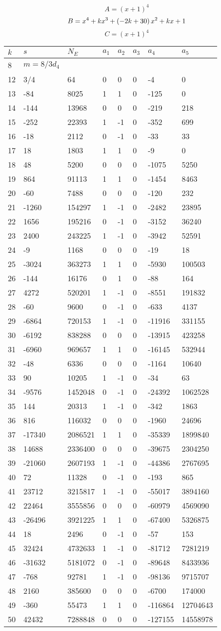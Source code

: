 \documentclass{amsart}
\begin{document}
$$A=(x
 + 1)^{4}$$
$$B=x^4
 + k\*x^3
 + \left(-2\*k
 + 30\right) \*x^2
 + k\*x
 + 1$$
$$C=(x
 + 1)^{4}$$
\begin{longtable}{|l|l|l|lllll|}
\hline
$k$ & $s$ & $N_E$ & $a_1$ & $a_2$ & $a_3$ & $a_4$ & $a_5$\\
\hline
8&$m=8/3d_{4}$&&\multicolumn{5}{c|}{}\\
12&3/4&64&0&0&0&-4&0\\
13&-84&8025&1&1&0&-125&0\\
14&-144&13968&0&0&0&-219&218\\
15&-252&22393&1&-1&0&-352&699\\
16&-18&2112&0&-1&0&-33&33\\
17&18&1803&1&1&0&-9&0\\
18&48&5200&0&0&0&-1075&5250\\
19&864&91113&1&1&0&-1454&8463\\
20&-60&7488&0&0&0&-120&232\\
21&-1260&154297&1&-1&0&-2482&23895\\
22&1656&195216&0&-1&0&-3152&36240\\
23&2400&243225&1&-1&0&-3942&52591\\
24&-9&1168&0&0&0&-19&18\\
25&-3024&363273&1&1&0&-5930&100503\\
26&-144&16176&0&1&0&-88&164\\
27&4272&520201&1&-1&0&-8551&191832\\
28&-60&9600&0&-1&0&-633&4137\\
29&-6864&720153&1&-1&0&-11916&331155\\
30&-6192&838288&0&0&0&-13915&423258\\
31&-6960&969657&1&1&0&-16145&532944\\
32&-48&6336&0&0&0&-1164&10640\\
33&90&10205&1&-1&0&-34&63\\
34&-9576&1452048&0&-1&0&-24392&1062528\\
35&144&20313&1&-1&0&-342&1863\\
36&816&116032&0&0&0&-1960&24696\\
37&-17340&2086521&1&1&0&-35339&1899840\\
38&14688&2336400&0&0&0&-39675&2304250\\
39&-21060&2607193&1&-1&0&-44386&2767695\\
40&72&11328&0&-1&0&-193&865\\
41&23712&3215817&1&-1&0&-55017&3894160\\
42&22464&3555856&0&0&0&-60979&4569090\\
43&-26496&3921225&1&1&0&-67400&5326875\\
44&18&2496&0&-1&0&-57&153\\
45&32424&4732633&1&-1&0&-81712&7281219\\
46&-31632&5181072&0&-1&0&-89648&8433936\\
47&-768&92781&1&-1&0&-98136&9715707\\
48&2160&385600&0&0&0&-6700&174000\\
49&-360&55473&1&1&0&-116864&12704643\\
50&42432&7288848&0&0&0&-127155&14558978\\
\hline
\end{longtable}
\end{document}
